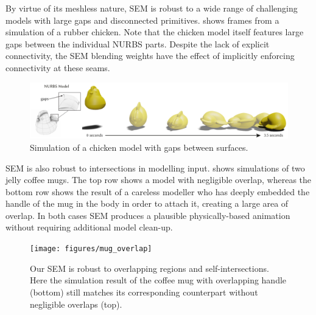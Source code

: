 By virtue of its meshless nature, SEM is robust to a wide range of challenging models with large gaps and disconnected primitives.
 shows frames from a simulation of a rubber chicken. Note that the chicken model itself features large gaps between the individual NURBS parts. 
Despite the lack of explicit connectivity, the SEM blending weights have the effect of implicitly enforcing connectivity at these seams. 

\begin{figure}[htp]
  \includegraphics[width=\textwidth]{figures/chicken.pdf}
  \caption{Simulation of a chicken model with gaps between surfaces.}
  \label{fig:chicken}
\end{figure}

SEM is also robust to intersections in modelling input.  shows simulations of two jelly coffee mugs. 
The top row shows a model with negligible overlap, whereas the bottom row shows the result of a careless modeller who has deeply embedded the handle of the mug in the body in order to attach it, creating a large area of overlap.
In both cases SEM produces a plausible physically-based animation without requiring additional model clean-up.

\begin{figure}[H]
  \texttt{[image: figures/mug\_overlap]}
  \caption{Our SEM is robust to overlapping regions and self-intersections. Here the simulation result of the coffee mug with overlapping handle (bottom) still matches its corresponding counterpart without negligible overlaps (top). }
  \label{fig:badmodels}
\end{figure}

